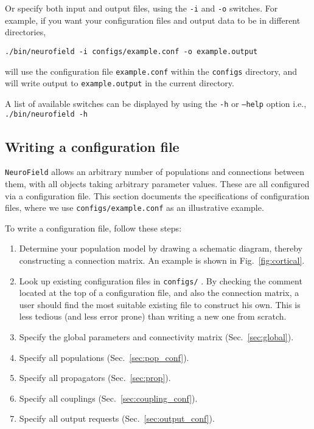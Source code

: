 \documentclass[12pt,a4paper]{article}
\newcommand{\type}[1]{{\small\small\tt #1} }
\newcommand{\NF}[0]{\type{NeuroField}}
\begin{document}
Or specify both input and output files, using the \type{-i} and \type{-o} switches. For example, if you want your configuration files and output data to be in different directories,

\begin{lstlisting}
./bin/neurofield -i configs/example.conf -o example.output
\end{lstlisting}

will use the configuration file \type{example.conf} within the \type{configs} directory, and will write output to \type{example.output} in the current directory.

A list of available switches can be displayed by using the \type{-h} or \type{--help} option i.e., \type{./bin/neurofield -h}

\subsection{Writing a configuration file}
\label{sec:config}

\NF allows an arbitrary number of populations and connections between them, with all objects taking arbitrary parameter values. These are all configured via a configuration file. This section documents the specifications of configuration files, where we use \type{configs/example.conf} as an illustrative example.

To write a configuration file, follow these steps:
\begin{enumerate}
\item Determine your population model by drawing a schematic diagram, thereby constructing a connection matrix. An example is shown in Fig.~\ref{fig:cortical}.
\item Look up existing configuration files in \type{configs/}. By checking the comment located at the top of a configuration file, and also the connection matrix, a user should find the most suitable existing file to construct his own. This is less tedious (and less error prone) than writing a new one from scratch.
\item Specify the global parameters and connectivity matrix (Sec.~\ref{sec:global}).
\item Specify all populations (Sec.~\ref{sec:pop_conf}).
\item Specify all propagators (Sec.~\ref{sec:prop}).
\item Specify all couplings (Sec.~\ref{sec:coupling_conf}).
\item Specify all output requests (Sec.~\ref{sec:output_conf}).
\end{enumerate}
\end{document}
